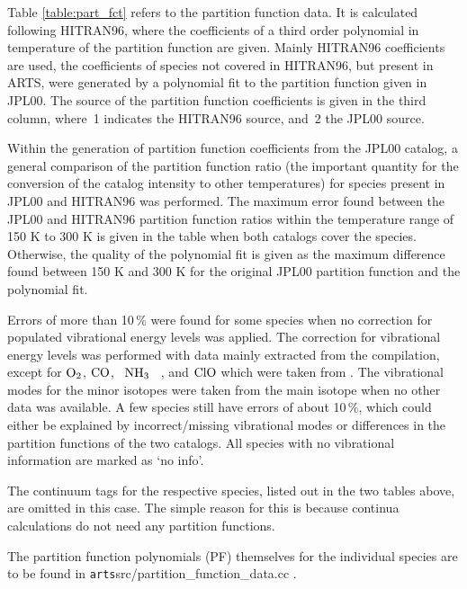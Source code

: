 Table \ref{table:part_fct} refers to the partition function data.  It
is calculated following HITRAN96, where the coefficients of a third
order polynomial in temperature of the partition function are given.
Mainly HITRAN96 coefficients are used, the coefficients of species not
covered in HITRAN96, but present in ARTS, were generated by a
polynomial fit to the partition function given in JPL00. The source of
the partition function coefficients is given in the third column,
where~1 indicates the HITRAN96 source, and~2 the JPL00 source.

Within the generation of partition function coefficients from the
JPL00 catalog, a general comparison of the partition function ratio
(the important quantity for the conversion of the catalog intensity to
other temperatures) for species present in JPL00 and HITRAN96 was
performed. The maximum error found between the JPL00 and HITRAN96
partition function ratios within the temperature range of 150 K  to
300 K is given in the table when both catalogs cover the species.
Otherwise, the quality of the polynomial fit is given as the maximum
difference found between 150 K and 300 K  for the original JPL00
partition function and the polynomial fit.

Errors of more than 10\,\%  were found for some species when no
correction for populated vibrational energy levels was applied. The
correction for vibrational energy levels was performed with data
mainly extracted from the  \citet{chase:85} compilation, except for $\mbox{O}_2$,
$\mbox{CO}$,~ $\mbox{NH}_3$~ , and $\mbox{ClO}$ which were taken from \citet {pwr:93}.
The vibrational modes for the minor isotopes were taken from the main
isotope when no other data was available. A few species still have
errors of about 10\,\%, which could either be explained by
incorrect/missing vibrational modes or differences in the partition
functions of the two catalogs. All species with no vibrational
information are marked as `no info'.

The continuum tags for the respective species, listed out in the two
tables above, are omitted in this case. The simple reason for this is
because continua calculations do not need any partition functions.

The partition function polynomials (PF) themselves for the individual
species are to be found in {\verb /arts/src/partition_function_data.cc} .


